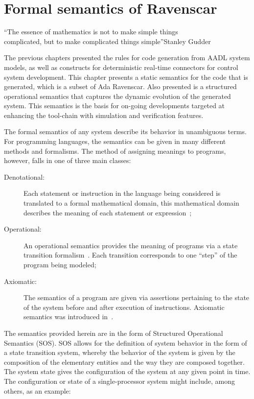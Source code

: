 \chapter{Formal semantics of Ravenscar}{``The essence of
  mathematics is not to make simple things\\complicated, but to make
  complicated things simple''}{Stanley Gudder}
\label{chap:formal_sem}

The previous chapters presented the rules for code generation from
AADL system models, as well as constructs for deterministic real-time
connectors for control system development. This chapter presents a
static semantics for the code that is generated, which is a subset of
Ada Ravenscar. Also presented is a structured operational semantics
that captures the dynamic evolution of the generated system. This
semantics is the basis for on-going developments targeted at enhancing
the tool-chain with simulation and verification features.

The formal semantics of any system describe its behavior in
unambiguous terms. For programming languages, the semantics can be
given in many different methods and formalisms. The method of
assigning meanings to programs, however, falls in one of three main
classes:\\

\begin{description}
\item[Denotational:]{Each statement or instruction in the language
  being considered is translated to a formal mathematical domain, this
  mathematical domain describes the meaning of each statement or
  expression~\cite{tennent@cacm76};}
\item[Operational:]{An operational semantics provides the meaning of
  programs via a state transition formalism~\cite{plotkin-sos}. Each
  transition corresponds to one ``step'' of the program being
  modeled;}
\item[Axiomatic:]{The semantics of a program are given via assertions
  pertaining to the state of the system before and after execution of
  instructions. Axiomatic semantics was introduced
  in~\cite{floyd@macs67, hoare@cacm69}.}
\end{description}

The semantics provided herein are in the form of Structured
Operational Semantics (SOS). SOS allows for the definition of system
behavior in the form of a state transition system, whereby the
behavior of the system is given by the composition of the elementary
entities and the way they are composed together. The system state
gives the configuration of the system at any given point in time. The
configuration or state of a single-processor system might include,
among others, as an example:

